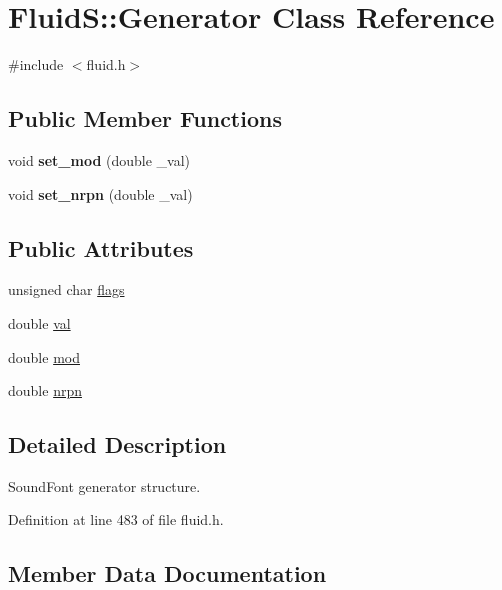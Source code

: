 \hypertarget{class_fluid_s_1_1_generator}{}\section{FluidS\+:\+:Generator Class Reference}
\label{class_fluid_s_1_1_generator}


{\ttfamily \#include $<$fluid.\+h$>$}

\subsection*{Public Member Functions}
\begin{DoxyCompactItemize}
\item 
\mbox{\label{class_fluid_s_1_1_generator_afeac2d9329780e84d93807eb079bded9}} 
void {\bfseries set\+\_\+mod} (double \+\_\+val)
\item 
\mbox{\label{class_fluid_s_1_1_generator_a2108d64d6e7f6da4219ef8d0205032c1}} 
void {\bfseries set\+\_\+nrpn} (double \+\_\+val)
\end{DoxyCompactItemize}
\subsection*{Public Attributes}
\begin{DoxyCompactItemize}
\item 
unsigned char \hyperlink{class_fluid_s_1_1_generator_a6a78ceaca1b7ae0e6d614102e8627f59}{flags}
\item 
double \hyperlink{class_fluid_s_1_1_generator_a78dcb7e1ea517959ec701058a8376c10}{val}
\item 
double \hyperlink{class_fluid_s_1_1_generator_aa2862594d10fb4fb6fc7dc12c23f008a}{mod}
\item 
double \hyperlink{class_fluid_s_1_1_generator_a344988fb2ebddced302de4c1e1b4fea8}{nrpn}
\end{DoxyCompactItemize}


\subsection{Detailed Description}
Sound\+Font generator structure. 

Definition at line 483 of file fluid.\+h.



\subsection{Member Data Documentation}
\mbox{\label{class_fluid_s_1_1_generator_a6a78ceaca1b7ae0e6d614102e8627f59}} 
